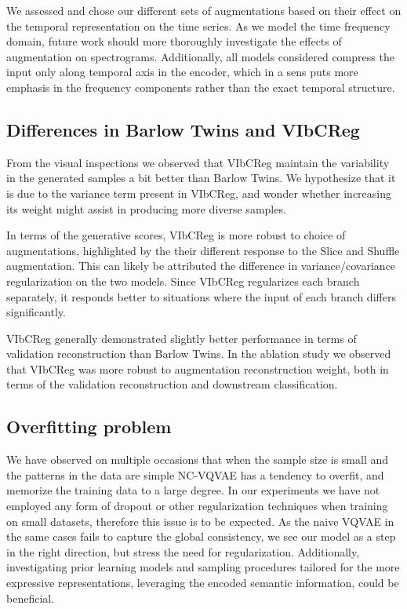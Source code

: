 \documentclass[../../thesis.tex]{subfiles}
\begin{document}
We assessed and chose our different sets of augmentations based on their effect on the temporal representation on the time series. As we model the time frequency domain, future work should more thoroughly investigate the effects of augmentation on spectrograms. Additionally, all models considered compress the input only along temporal axis in the encoder, which in a sens puts more emphasis in the frequency components rather than the exact temporal structure. 

\subsection*{Differences in Barlow Twins and VIbCReg}

From the visual inspections we observed that VIbCReg maintain the variability in the generated samples a bit better than Barlow Twins. We hypothesize that it is due to the variance term present in VIbCReg, and wonder whether increasing its weight might assist in producing more diverse samples. \newline

In terms of the generative scores, VIbCReg is more robust to choice of augmentations, highlighted by the their different response to the Slice and Shuffle augmentation. This can likely be attributed the difference in variance/covariance regularization on the two models. Since VIbCReg regularizes each branch separately, it responds better to situations where the input of each branch differs significantly. \newline

VIbCReg generally demonstrated slightly better performance in terms of validation reconstruction than Barlow Twins. In the ablation study we observed that VIbCReg was more robust to augmentation reconstruction weight, both in terms of the validation reconstruction and downstream classification.

\subsection*{Overfitting problem}

We have observed on multiple occasions that when the sample size is small and the patterns in the data are simple NC-VQVAE has a tendency to overfit, and memorize the training data to a large degree. In our experiments we have not employed any form of dropout or other regularization techniques when training on small datasets, therefore this issue is to be expected. As the naive VQVAE in the same cases fails to capture the global consistency, we see our model as a step in the right direction, but stress the need for regularization. Additionally, investigating prior learning models and sampling procedures tailored for the more expressive representations, leveraging the encoded semantic information, could be beneficial. 
\end{document}
